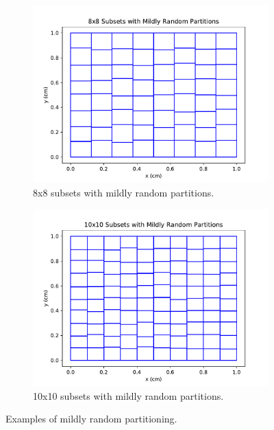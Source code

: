 \begin{figure}[H]
\begin{subfigure}[b]{0.45\textwidth}
  \includegraphics[width=\textwidth]{../cut_line_files/8_mild_random.pdf}
  \caption{8x8 subsets with mildly random partitions.}
  \label{8mildrandom}
\end{subfigure}
\begin{subfigure}[b]{0.45\textwidth}
  \includegraphics[width=\textwidth]{../cut_line_files/10_mild_random.pdf}
  \caption{10x10 subsets with mildly random partitions.}
  \label{10mildrandom}
\end{subfigure}
\caption{Examples of mildly random partitioning.}
\label{mild_random_partitions}
\end{figure}


